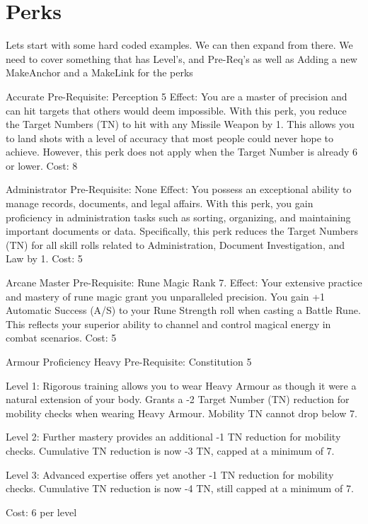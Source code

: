 \documentclass[12pt]{article}
\begin{document}
\section{Perks}
\begin{multicols}{2}

Lets start with some hard coded examples. We can then expand from there.
We need to cover something that has Level's, and Pre-Req's as well as Adding a new MakeAnchor and a MakeLink for the perks

Accurate
Pre-Requisite: Perception 5
Effect: You are a master of precision and can hit targets that others would deem impossible. With this perk, you reduce the Target Numbers (TN) to hit with any Missile Weapon by 1. This allows you to land shots with a level of accuracy that most people could never hope to achieve. However, this perk does not apply when the Target Number is already 6 or lower.
Cost: 8

Administrator
Pre-Requisite: None
Effect: You possess an exceptional ability to manage records, documents, and legal affairs. With this perk, you gain proficiency in administration tasks such as sorting, organizing, and maintaining important documents or data. Specifically, this perk reduces the Target Numbers (TN) for all skill rolls related to Administration, Document Investigation, and Law by 1.
Cost: 5

Arcane Master
Pre-Requisite: Rune Magic Rank 7.
Effect: Your extensive practice and mastery of rune magic grant you unparalleled precision. You gain +1 Automatic Success (A/S) to your Rune Strength roll when casting a Battle Rune. This reflects your superior ability to channel and control magical energy in combat scenarios. 
Cost: 5

Armour Proficiency Heavy
Pre-Requisite: Constitution 5

Level 1: Rigorous training allows you to wear Heavy Armour as though it were a natural extension of your body. Grants a -2 Target Number (TN) reduction for mobility checks when wearing Heavy Armour. Mobility TN cannot drop below 7.

Level 2: Further mastery provides an additional -1 TN reduction for mobility checks. Cumulative TN reduction is now -3 TN, capped at a minimum of 7.

Level 3: Advanced expertise offers yet another -1 TN reduction for mobility checks. Cumulative TN reduction is now -4 TN, still capped at a minimum of 7.

Cost: 6 per level 

\end{multicols}
\newpage
\end{document}

